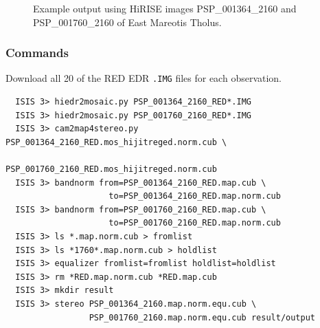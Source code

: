 \begin{figure}[h!]
\centering
  \hfil
\caption{Example output using HiRISE images PSP\_001364\_2160 and
  PSP\_001760\_2160 of East Mareotis Tholus.}
\label{fig:hirise_emare_example}
\end{figure}

\subsubsection*{Commands}

Download all 20 of the RED EDR \texttt{.IMG} files for each observation.
\begin{verbatim}
  ISIS 3> hiedr2mosaic.py PSP_001364_2160_RED*.IMG
  ISIS 3> hiedr2mosaic.py PSP_001760_2160_RED*.IMG
  ISIS 3> cam2map4stereo.py PSP_001364_2160_RED.mos_hijitreged.norm.cub \
                            PSP_001760_2160_RED.mos_hijitreged.norm.cub
  ISIS 3> bandnorm from=PSP_001364_2160_RED.map.cub \
                     to=PSP_001364_2160_RED.map.norm.cub
  ISIS 3> bandnorm from=PSP_001760_2160_RED.map.cub \
                     to=PSP_001760_2160_RED.map.norm.cub
  ISIS 3> ls *.map.norm.cub > fromlist
  ISIS 3> ls *1760*.map.norm.cub > holdlist
  ISIS 3> equalizer fromlist=fromlist holdlist=holdlist
  ISIS 3> rm *RED.map.norm.cub *RED.map.cub
  ISIS 3> mkdir result
  ISIS 3> stereo PSP_001364_2160.map.norm.equ.cub \
                 PSP_001760_2160.map.norm.equ.cub result/output
\end{verbatim}

